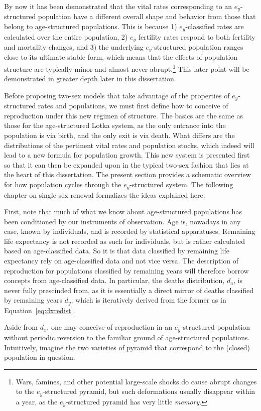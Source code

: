  \FloatBarrier
\label{sec:exstructuredrenewal}
By now it has been demonstrated that the vital rates corresponding to an
$e_y$-structured population have a different overall shape and behavior from
those that belong to age-structured populations. This is because 1) $e_y$-classified rates
are calculated over the entire population, 2) $e_y$ fertility rates respond to
both fertility and mortality changes, and 3) the underlying $e_y$-structured
population ranges close to its ultimate stable form, which means that
the effects of population structure are typically minor and almost never
abrupt.\footnote{Wars, famines, and other potential large-scale shocks do cause
abrupt changes to the $e_y$-structured pyramid, but such deformations usually
disappear within a year, as the  $e_y$-structured pyramid has very little
\textit{memory}.} This later point will be demonstrated in greater depth later
in this dissertation.

Before proposing two-sex models that take advantage of the properties of
$e_y$-structured rates and populations, we must first define how to conceive of
reproduction under this new regimen of structure. The basics are the
same as those for the age-structured Lotka system, as the only entrance into the
population is via birth, and the only exit is via death. What differs are the
distributions of the pertinent vital rates and population stocks, which indeed
will lead to a new formula for population growth. This new system is 
presented first so that it can then be expanded upon in the typical two-sex
fashion that lies at the heart of this dissertation. The present section
provides a schematic overview for how population cycles through the
$e_y$-structured system. The following chapter on single-sex renewal formalizes
the ideas explained here.

First, note that much of what we know about age-structured populations has been
conditioned by our instruments of observation. Age is, nowadays in any case,
known by individuals, and is recorded by statistical apparatuses. Remaining life
expectancy is not recorded as such for individuals, but is rather calculated
based on age-classified data. So it is that data classified by remaining
life expectancy rely on age-classified data and not vice versa. The description of 
reproduction for populations classified by remaining years will therefore
 borrow concepts from age-classified data. In particular, the deaths
distribution, $d_a$, is never fully prescinded from, as it is essentially a
direct mirror of deaths classified by remaining years $d_y$, which is
iteratively derived from the former as in Equation~\eqref{eq:dxredist}.

Aside from $d_x$, one may conceive of reproduction in an $e_y$-structured
population without periodic reversion to the familiar ground of age-structured
populations. Intuitively, imagine the two varieties of pyramid that correspond to the
(closed) population in question. 